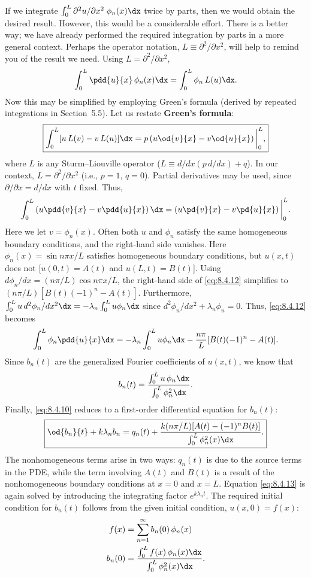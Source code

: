 If we integrate $\int_0^L \partial^2 u/\partial x^2\;\phi_n(x)\dx$ twice by parts, then we would obtain the desired result.  However, this would be a considerable effort.  There is a better way; we have already performed the required integration by parts in a more general context.  Perhaps the operator notation, $L\equiv \partial^2/\partial x^2$, will help to remind you of the result we need.  Using $L = \partial^2/\partial x^2$,
\[
\int_0^L \pdd{u}{x}\,\phi_n(x)\dx = \int_0^L \phi_n\,L(u)\dx.
\]
Now this may be simplified by employing Green's formula (derived by repeated integrations in Section~5.5).  Let us restate \textbf{Green's formula}:
\begin{equation}
\label{eq:8.4.11}
\boxed{\int_0^L [u\,L(v) - v\,L(u)]\dx = p\left(u\od{v}{x} - v\od{u}{x}\right)\bigg|_0^L,}
\end{equation}
where $L$ is any Sturm--Liouville operator ($L \equiv d/dx(p\,d/dx) + q$).  In our context, $L = \partial^2/\partial x^2$ (i.e., $p=1$, $q=0$).  Partial derivatives may be used, since $\partial/\partial x = d/dx$ with $t$ fixed.  Thus,
\begin{equation}
\label{eq:8.4.12}
\int_0^L \left(u\pdd{v}{x} - v\pdd{u}{x}\right)\dx = \left(u\pd{v}{x} - v\pd{u}{x}\right)\bigg|_0^L.
\end{equation}
Here we let $v = \phi_n(x)$.  Often both $u$ and $\phi_n$ satisfy the same homogeneous boundary conditions, and the right-hand side vanishes.  Here $\phi_n(x) = \sin n\pi x/L$ satisfies homogeneous boundary conditions, but $u(x,t)$ does not [$u(0,t) = A(t)$ and $u(L,t) = B(t)$].  Using $d\phi_n/dx = (n\pi/L)\cos n\pi x/L$, the right-hand side of \eqref{eq:8.4.12} simplifies to $(n\pi/L)[B(t)(-1)^n - A(t)]$.  Furthermore, $\int_0^L u\,d^2\phi_n/dx^2\dx = -\lambda_n\int_0^L u\phi_n\dx$ since $d^2\phi_n/dx^2 + \lambda_n\phi_n = 0$.  Thus, \eqref{eq:8.4.12} becomes
\[
\int_0^L \phi_n\pdd{u}{x}\dx = -\lambda_n\int_0^L u\phi_n\dx - \frac{n\pi}{L}[B(t)(-1)^n - A(t)].
\]
Since $b_n(t)$ are the generalized Fourier coefficients of $u(x,t)$, we know that
\[
b_n(t) = \frac{\int_0^L u\,\phi_n\dx}{\int_0^L \phi_n^2\dx}.
\]
Finally, \eqref{eq:8.4.10} reduces to a first-order differential equation for $b_n(t)$:
\begin{equation}
\label{eq:8.4.13}
\boxed{\od{b_n}{t} + k\lambda_n b_n = q_n(t) + \frac{k(n\pi/L)[A(t)-(-1)^n B(t)]}{\int_0^L \phi_n^2(x)\dx}.}
\end{equation}
The nonhomogeneous terms arise in two ways: $q_n(t)$ is due to the source terms in the PDE, while the term involving $A(t)$ and $B(t)$ is a result of the nonhomogeneous boundary conditions at $x=0$ and $x=L$.  Equation \eqref{eq:8.4.13} is again solved by introducing the integrating factor $e^{k\lambda_n t}$.  The required initial condition for $b_n(t)$ follows from the given initial condition, $u(x,0) = f(x)$:
\begin{align*}
f(x) &= \sum_{n=1}^{\infty} b_n(0)\,\phi_n(x) \\
b_n(0) &= \frac{\int_0^L f(x)\,\phi_n(x)\dx}{\int_0^L \phi_n^2(x)\dx}.
\end{align*}

